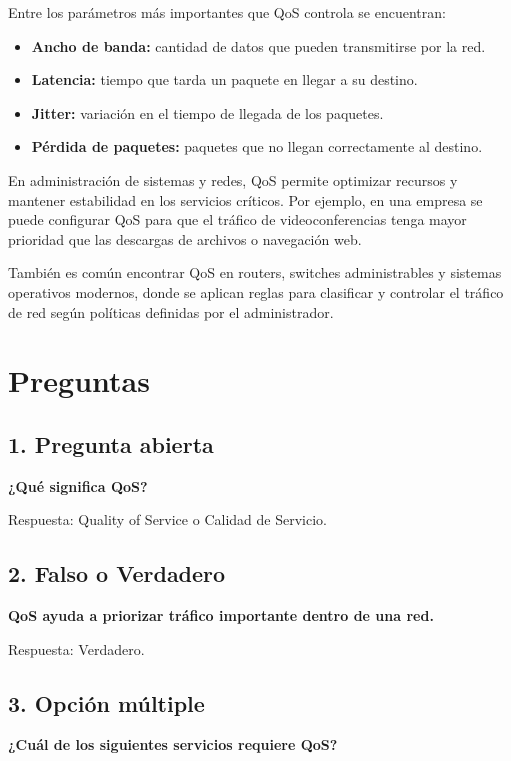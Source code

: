 \documentclass[12pt]{article}
\begin{document}
Entre los parámetros más importantes que QoS controla se encuentran:

\begin{itemize}
    \item \textbf{Ancho de banda:} cantidad de datos que pueden transmitirse por la red.
    \item \textbf{Latencia:} tiempo que tarda un paquete en llegar a su destino.
    \item \textbf{Jitter:} variación en el tiempo de llegada de los paquetes.
    \item \textbf{Pérdida de paquetes:} paquetes que no llegan correctamente al destino.
\end{itemize}

En administración de sistemas y redes, QoS permite optimizar recursos y mantener estabilidad en los servicios críticos. Por ejemplo, en una empresa se puede configurar QoS para que el tráfico de videoconferencias tenga mayor prioridad que las descargas de archivos o navegación web.

También es común encontrar QoS en routers, switches administrables y sistemas operativos modernos, donde se aplican reglas para clasificar y controlar el tráfico de red según políticas definidas por el administrador.

\section*{Preguntas}

\subsection*{1. Pregunta abierta}
\textbf{¿Qué significa QoS?}

Respuesta: Quality of Service o Calidad de Servicio.

\vspace{0.5cm}

\subsection*{2. Falso o Verdadero}
\textbf{QoS ayuda a priorizar tráfico importante dentro de una red.}

Respuesta: Verdadero.

\vspace{0.5cm}

\subsection*{3. Opción múltiple}
\textbf{¿Cuál de los siguientes servicios requiere QoS?}
\end{document}
